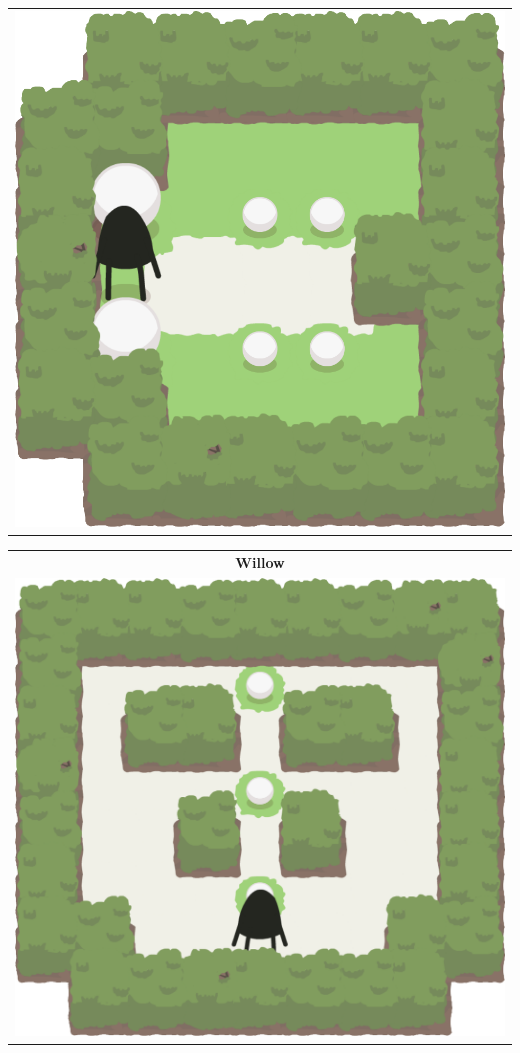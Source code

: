 \documentclass{report}
\theoremstyle{plain}
\begin{document}
\begin{center}
\begin{tabular}{c}
\includegraphics[scale=\levelAnnexWidth]{jack-jill-1.png}
\end{tabular}
\begin{tabular}{c}
\textbf{Willow} \\
\includegraphics[scale=\levelAnnexWidth]{willow-1.png}

\end{tabular}
\end{center}
\end{document}
